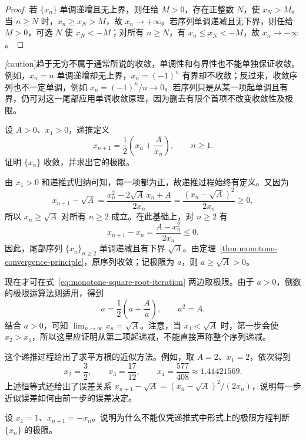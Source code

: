 \begin{proof}
若 $\{x_n\}$ 单调递增且无上界，则任给 $M>0$，存在正整数 $N$，使 $x_N>M$。当 $n\geq N$ 时，$x_n\geq x_N>M$，故 $x_n\to+\infty$。若序列单调递减且无下界，则任给 $M>0$，可选 $N$ 使 $x_N<-M$；对所有 $n\geq N$，有 $x_n\leq x_N<-M$，故 $x_n\to-\infty$。
\end{proof}

\emph[caution]{趋于无穷不属于通常所说的收敛，单调性和有界性也不能单独保证收敛。}例如，$x_n=n$ 单调递增却无上界，$x_n=(-1)^n$ 有界却不收敛；反过来，收敛序列也不一定单调，例如 $x_n=(-1)^n/n\to0$。若序列只是从某一项起单调且有界，仍可对这一尾部应用单调收敛原理，因为删去有限个首项不改变收敛性及极限。

\begin{example}
\label{ex:monotone-square-root-iteration}
设 $A>0$、$x_1>0$，递推定义
\begin{equation}
    x_{n+1}=\frac12\left(x_n+\frac{A}{x_n}\right),\qquad n\geq1.
    \label{eq:monotone-square-root-iteration}
\end{equation}
证明 $\{x_n\}$ 收敛，并求出它的极限。
\end{example}

\begin{solve}
由 $x_1>0$ 和递推式归纳可知，每一项都为正，故递推过程始终有定义。又因为
\[
    x_{n+1}-\sqrt A
    =\frac{x_n^2-2\sqrt A\,x_n+A}{2x_n}
    =\frac{(x_n-\sqrt A)^2}{2x_n}\geq0,
\]
所以 $x_n\geq\sqrt A$ 对所有 $n\geq2$ 成立。在此基础上，对 $n\geq2$ 有
\[
    x_{n+1}-x_n
    =\frac{A-x_n^2}{2x_n}\leq0.
\]
因此，尾部序列 $\{x_n\}_{n\geq2}$ 单调递减且有下界 $\sqrt A$。由定理~\ref{thm:monotone-convergence-principle}，原序列收敛；记极限为 $a$，则 $a\geq\sqrt A>0$。

现在才可在式~\eqref{eq:monotone-square-root-iteration} 两边取极限。由于 $a>0$，倒数的极限运算法则适用，得到
\[
    a=\frac12\left(a+\frac{A}{a}\right),
    \qquad a^2=A.
\]
结合 $a>0$，可知 $\lim_{n\to\infty}x_n=\sqrt A$。注意，当 $x_1<\sqrt A$ 时，第一步会使 $x_2>x_1$，所以这里应证明从第二项起递减，不能直接声称整个序列递减。
\end{solve}

这个递推过程给出了求平方根的近似方法。例如，取 $A=2$、$x_1=2$，依次得到
\[
    x_2=\frac32,\qquad x_3=\frac{17}{12},\qquad
    x_4=\frac{577}{408}\approx1.41421569.
\]
上述恒等式还给出了误差关系 $x_{n+1}-\sqrt A=(x_n-\sqrt A)^2/(2x_n)$，说明每一步近似误差如何由前一步的误差决定。

\begin{example}
\label{ex:recurrence-fixed-point-without-convergence}
设 $x_1=1$、$x_{n+1}=-x_n$。说明为什么不能仅凭递推式中形式上的极限方程判断 $\{x_n\}$ 的极限。
\end{example}

